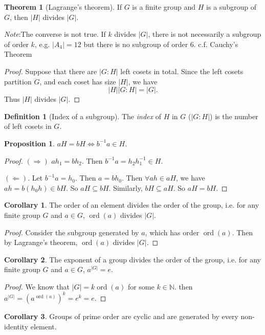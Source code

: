 \documentclass[a4paper]{article}
\theoremstyle{definition}
\newtheorem*{prop}{Proposition}
\newtheorem*{thm}{Theorem}
\newtheorem*{defi}{Definition}
\newtheorem*{cor}{Corollary}
\newcommand{\note}{\noindent \emph{Note}:\;}
\newcommand{\N}{\mathbb{N}}
\DeclareMathOperator\ord{ord}
\begin{document}
\begin{thm}[Lagrange's theorem]
  If $G$ is a finite group and $H$ is a subgroup of $G$, then $|H|$ divides $|G|$.
\end{thm}
\note The converse is not true. If $k$ divides $|G|$, there is not necessarily a subgroup of order $k$, e.g. $|A_4| = 12$ but there is no subgroup of order $6$. c.f. Cauchy's Theorem

\begin{proof}
  Suppose that there are $|G: H|$ left cosets in total. Since the left cosets partition $G$, and each coset has size $|H|$, we have
  \[
  |H||G:H| = |G|.
  \]
Thus $|H|$ divides $|G|$.
\end{proof}

\begin{defi}[Index of a subgroup]
  The \emph{index} of $H$ in $G$ ($|G:H|$) is the number of left cosets in $G$. 
\end{defi}

\begin{prop}
  $aH = bH \Leftrightarrow b^{-1}a\in H$.
\end{prop}
\begin{proof}
  $(\Rightarrow)$ $ah_1 = bh_2$. Then $b^{-1}a = h_2h_1^{-1}\in H$.

  $(\Leftarrow)$. Let $b^{-1}a = h_0$. Then $a = bh_0$. Then $\forall ah\in aH$, we have $ah = b(h_0h)\in bH$. So $aH \subseteq bH$. Similarly, $bH\subseteq aH$. So $aH = bH$.
\end{proof}

\begin{cor}
  The order of an element divides the order of the group, i.e. for any finite group $G$ and $a\in G$, $\ord(a)$ divides $|G|$.
\end{cor}
\begin{proof}
  Consider the subgroup generated by $a$, which has order $\ord(a)$. Then by Lagrange's theorem, $\ord(a)$ divides $|G|$.
\end{proof}

\begin{cor}
  The exponent of a group divides the order of the group, i.e. for any finite group $G$ and $a\in G$, $a^{|G|} = e$.
\end{cor}

\begin{proof}
  We know that $|G| = k\ord(a)$ for some $k\in \N$. then $a^{|G|} = (a^{\ord(a)})^k = e^k = e$.
\end{proof}

\begin{cor}
  Groups of prime order are cyclic and are generated by every non-identity element.
\end{cor}
\end{document}
